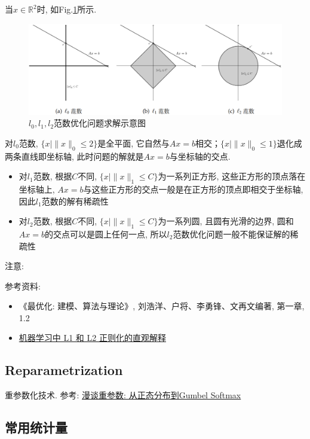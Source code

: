 当$x \in \mathbb{R}^2$时, 如Fig.\ref{fig:norm optimize}所示. 
\begin{figure}[h]
	\centering
	\includegraphics[width=.85\textwidth]{pics/norm optimize.png}
	\caption{$l_0, l_1, l_2$范数优化问题求解示意图}
	\label{fig:norm optimize}
\end{figure}
对$l_0$范数, $\{x | \|x\|_0 \leq 2\}$是全平面, 它自然与$A x = b$相交；$\{x | \|x\|_0 \leq 1\}$退化成两条直线即坐标轴, 此时问题的解就是$A x = b$与坐标轴的交点. 
\begin{itemize}
	\item 对$l_1$范数, 根据$C$不同, $\{x | \|x\|_1 \leq C\}$为一系列正方形, 这些正方形的顶点落在坐标轴上, $A x = b$与这些正方形的交点一般是在正方形的顶点即相交于坐标轴, 因此$l_1$范数的解有稀疏性
	
	\item 对$l_2$范数, 根据$C$不同, $\{x | \|x\|_1 \leq C\}$为一系列圆, 且圆有光滑的边界, 圆和$A x = b$的交点可以是圆上任何一点, 所以$l_2$范数优化问题一般不能保证解的稀疏性
\end{itemize}

注意: 

参考资料: 
\begin{itemize}
	\item《最优化: 建模、算法与理论》, 刘浩洋、户将、李勇锋、文再文编著, 第一章, 1.2
	\item \href{https://blog.csdn.net/red_stone1/article/details/80755144}{机器学习中 L1 和 L2 正则化的直观解释}
\end{itemize}


\subsection{Reparametrization}重参数化技术. 参考: \href{https://spaces.ac.cn/archives/6705}{漫谈重参数: 从正态分布到Gumbel Softmax}

\subsection{常用统计量}
